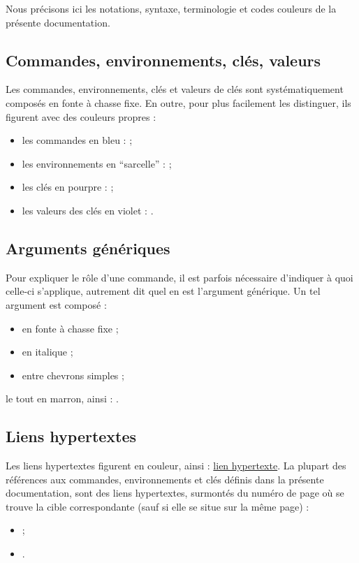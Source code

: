 \documentclass[french,nolocaltoc]{nwejmart}
\newtheorem[style=definition]{fait}
\newtheorem[title=contraventionnalisation]{ctrv}
\newtheorem[title-plural=anneaux]{anneau}
\newtheorem[title-plural=idéaux]{idéal}
\begin{document}
Nous précisons ici les notations, syntaxe, terminologie et codes couleurs de
la présente documentation.

\subsection{Commandes, environnements, clés, valeurs}\label{sec-comm-envir-cles}

Les commandes, environnements, clés et valeurs de clés sont systématiquement
composés en fonte à chasse fixe. En outre, pour plus facilement les
distinguer, ils figurent avec des couleurs propres :
\begin{itemize}
\item les commandes en bleu :  ;
\item les environnements en \enquote{sarcelle} :
   ;
\item les clés en pourpre :  ;
\item les valeurs des clés en violet : .
\end{itemize}

\subsection{Arguments génériques}
\label{sec-arguments-generiques}

Pour expliquer le rôle d'une commande, il est parfois nécessaire d'indiquer
à quoi celle-ci s'applique, autrement dit quel en est l'argument générique.
Un tel argument est composé :
\begin{itemize}
\item en fonte à chasse fixe ;
\item en italique ;
\item entre chevrons simples ;
\end{itemize}
le tout en marron, ainsi : .

\subsection{Liens hypertextes}
\label{sec-liens-hypertextes}

Les liens hypertextes figurent en couleur, ainsi :
\href{http://gte.univ-littoral.fr/members/dbitouze/pub/latex}{lien hypertexte}.
La plupart des références aux commandes, environnements et clés définis dans la
présente documentation, sont des liens hypertextes, surmontés du numéro de page
où se trouve la cible correspondante (sauf si elle se situe sur la même page) :
\begin{itemize}
\item {} ;
\item {}.
\end{itemize}
\end{document}
